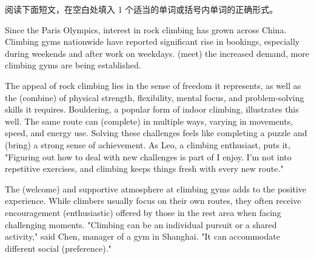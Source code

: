 \documentclass{英语试卷}
\begin{document}
\par 阅读下面短文，在空白处填入 1 个适当的单词或括号内单词的正确形式。\par
\par Since the Paris Olympics, interest in rock climbing has grown across China. Climbing gyms nationwide have reported  significant rise in bookings, especially during weekends and after work on weekdays.  (meet) the increased demand, more climbing gyms are being established.\par
\par The appeal of rock climbing lies in the sense of freedom it represents, as well as the  (combine) of physical strength, flexibility, mental focus, and problem-solving skills it requires. Bouldering, a popular form of indoor climbing, illustrates this well. The same route can  (complete) in multiple ways, varying in movements, speed, and energy use. Solving these challenges feels like completing a puzzle and  (bring) a strong sense of achievement. As Leo, a climbing enthusiast, puts it, "Figuring out how to deal with new challenges is part of  I enjoy. I'm not into repetitive exercises, and climbing keeps things fresh with every new route."\par
\par The  (welcome) and supportive atmosphere at climbing gyms adds to the positive experience. While climbers usually focus on their own routes, they often receive encouragement  (enthusiastic) offered by those in the rest area when facing challenging moments. "Climbing can be an individual pursuit or a shared activity," said Chen, manager of a gym in Shanghai. "It can accommodate different social  (preference)."\par
\end{document}
